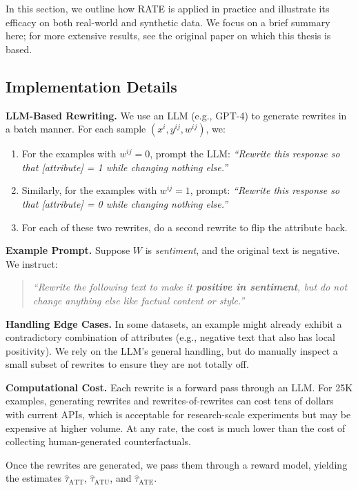 \documentclass{article}
\theoremstyle{definition}
\begin{document}
In this section, we outline how RATE is applied in practice and illustrate its efficacy on both real-world and synthetic data. We focus on a brief summary here; for more extensive results, see the original paper on which this thesis is based.

\subsection{Implementation Details}

\textbf{LLM-Based Rewriting.} We use an LLM (e.g., GPT-4) to generate rewrites in a batch manner. For each sample $(x^i, y^{ij}, w^{ij})$, we:
\begin{enumerate}
    \item For the examples with $w^{ij} = 0$, prompt the LLM: \emph{``Rewrite this response so that [attribute] = 1 while changing nothing else.''}
    \item Similarly, for the examples with $w^{ij} = 1$, prompt: \emph{``Rewrite this response so that [attribute] = 0 while changing nothing else.''}
    \item For each of these two rewrites, do a second rewrite to flip the attribute back.
\end{enumerate}

\textbf{Example Prompt.} Suppose $W$ is \emph{sentiment}, and the original text is negative. We instruct:  
\begin{quote}
\textit{``Rewrite the following text to make it \textbf{positive in sentiment}, but do not change anything else like factual content or style.''}
\end{quote}

\textbf{Handling Edge Cases.} In some datasets, an example might already exhibit a contradictory combination of attributes (e.g., negative text that also has local positivity). We rely on the LLM’s general handling, but do manually inspect a small subset of rewrites to ensure they are not totally off.

\textbf{Computational Cost.} Each rewrite is a forward pass through an LLM. For 25K examples, generating rewrites and rewrites-of-rewrites can cost tens of dollars with current APIs, which is acceptable for research-scale experiments but may be expensive at higher volume. At any rate, the cost is much lower than the cost of collecting human-generated counterfactuals.

Once the rewrites are generated, we pass them through a reward model, yielding the estimates $\hat{\tau}_{\text{ATT}}$, $\hat{\tau}_{\text{ATU}}$, and $\hat{\tau}_{\text{ATE}}$.
\end{document}
